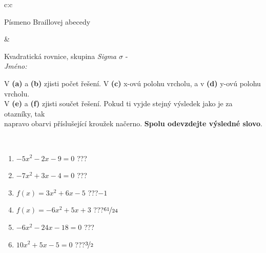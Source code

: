 \documentclass[10pt]{report}
\begin{document}
\begin{tabular}{c:c}
\begin{minipage}[c][104.5mm][t]{0.5\linewidth}
\begin{center}
\begin{minipage}{0.20\linewidth}
\begin{center}
{\small Písmeno Braillovej abecedy}
\end{center}
\end{minipage}
\end{center}
\end{minipage}
&
\begin{minipage}[c][104.5mm][t]{0.5\linewidth}
\begin{center}
\vspace{7mm}
{\huge Kvadratická rovnice, skupina \textit{Sigma $\sigma$} -}\\[5mm]
\textit{Jméno:}\phantom{xxxxxxxxxxxxxxxxxxxxxxxxxxxxxxxxxxxxxxxxxxxxxxxxxxxxxxxxxxxxxxxxx}\\[5mm]
\begin{minipage}{0.95\linewidth}
\begin{center}
V \textbf{(a)} a \textbf{(b)} zjisti počet řešení. V \textbf{(c)} x-ovú polohu vrcholu, a v \textbf{(d)} y-ovú polohu vrcholu.\\V \textbf{(e)} a \textbf{(f)} zjisti součet řešení. Pokud ti vyjde stejný výsledek jako je za otazníky, tak\\napravo obarvi příslušející kroužek načerno. \textbf{Spolu odevzdejte výsledné slovo}.
\end{center}
\end{minipage}
\\[1mm]
\begin{minipage}{0.79\linewidth}
\begin{center}
\begin{varwidth}{\linewidth}
\begin{enumerate}
\Large
\item $-5x^2-2x-9=0$\quad \dotfill\; ???\;\dotfill {}
\item $-7x^2+3x-4=0$\quad \dotfill\; ???\;\dotfill {}
\item $f(x)=3x^2+6x-5$\quad \dotfill\; ???\;\dotfill \quad $-1$
\item $f(x)=-6x^2+5x+3$\quad \dotfill\; ???\;\dotfill \quad $\nicefrac{61}{24}$
\item $-6x^2-24x-18=0$\quad \dotfill\; ???\;\dotfill {}
\item $10x^2+5x-5=0$\quad \dotfill\; ???\;\dotfill \quad $\nicefrac{3}{2}$
\end{enumerate}
\end{varwidth}
\end{center}
\end{minipage}
\begin{minipage}{0.20\linewidth}
\begin{center}

\end{center}
\end{minipage}
\end{center}
\end{minipage}
\end{tabular}
\end{document}
